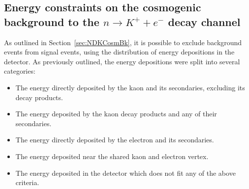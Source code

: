 \subsection{Energy constraints on the cosmogenic background to the $n \rightarrow K^{+} + e^{-}$ decay channel} \label{sec:NDKEnCosmBk}
As outlined in Section~\ref{sec:NDKCosmBk}, it is possible to exclude background events from signal events, using the distribution of energy depositions in the detector. As previously outlined, the energy depositions were split into several categories:
\begin{itemize}
\item The energy directly deposited by the kaon and its secondaries, excluding its decay products.
\item The energy deposited by the kaon decay products and any of their secondaries.
\item The energy directly deposited by the electron and its secondaries.
\item The energy deposited near the shared kaon and electron vertex.
\item The energy deposited in the detector which does not fit any of the above criteria.
\end{itemize}
